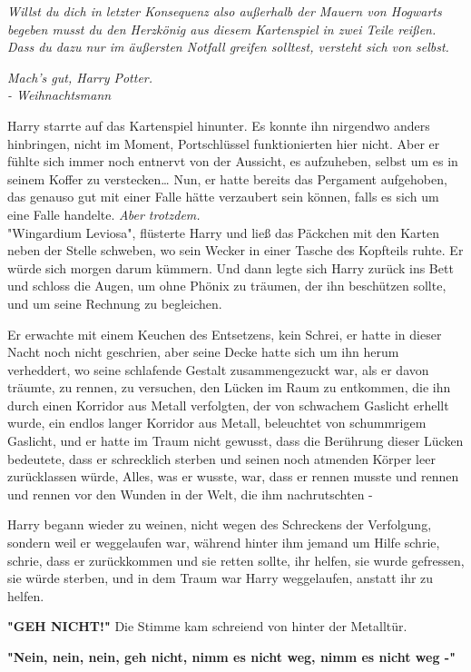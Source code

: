 {\emph{Willst du dich in letzter Konsequenz also außerhalb der Mauern von Hogwarts begeben musst du den Herzkönig aus diesem Kartenspiel in zwei Teile reißen. Dass du dazu nur im äußersten Notfall greifen solltest, versteht sich von selbst.}

\emph{Mach's gut, Harry Potter.\\ - Weihnachtsmann}

Harry starrte auf das Kartenspiel hinunter. Es konnte ihn nirgendwo anders hinbringen, nicht im Moment, Portschlüssel funktionierten hier nicht. Aber er fühlte sich immer noch entnervt von der Aussicht, es aufzuheben, selbst um es in seinem Koffer zu verstecken… Nun, er hatte bereits das Pergament aufgehoben, das genauso gut mit einer Falle hätte verzaubert sein können, falls es sich um eine Falle handelte. \emph{Aber trotzdem.}\\ "Wingardium Leviosa", flüsterte Harry und ließ das Päckchen mit den Karten neben der Stelle schweben, wo sein Wecker in einer Tasche des Kopfteils ruhte. Er würde sich morgen darum kümmern. Und dann legte sich Harry zurück ins Bett und schloss die Augen, um ohne Phönix zu träumen, der ihn beschützen sollte, und um seine Rechnung zu begleichen.

Er erwachte mit einem Keuchen des Entsetzens, kein Schrei, er hatte in dieser Nacht noch nicht geschrien, aber seine Decke hatte sich um ihn herum verheddert, wo seine schlafende Gestalt zusammengezuckt war, als er davon träumte, zu rennen, zu versuchen, den Lücken im Raum zu entkommen, die ihn durch einen Korridor aus Metall verfolgten, der von schwachem Gaslicht erhellt wurde, ein endlos langer Korridor aus Metall, beleuchtet von schummrigem Gaslicht, und er hatte im Traum nicht gewusst, dass die Berührung dieser Lücken bedeutete, dass er schrecklich sterben und seinen noch atmenden Körper leer zurücklassen würde, Alles, was er wusste, war, dass er rennen musste und rennen und rennen vor den Wunden in der Welt, die ihm nachrutschten -

Harry begann wieder zu weinen, nicht wegen des Schreckens der Verfolgung, sondern weil er weggelaufen war, während hinter ihm jemand um Hilfe schrie, schrie, dass er zurückkommen und sie retten sollte, ihr helfen, sie wurde gefressen, sie würde sterben, und in dem Traum war Harry weggelaufen, anstatt ihr zu helfen.

\textbf{"GEH NICHT!"} Die Stimme kam schreiend von hinter der Metalltür.

\textbf{"Nein, nein, nein, geh nicht, nimm es nicht weg, nimm es nicht weg -"}

}
